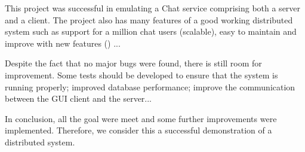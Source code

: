 This project was successful in emulating a Chat service comprising both a server and a client.
The project also has many features of a good working distributed system such as support for a million chat users (scalable), easy to maintain and improve with new features () ... 

Despite the fact that no major bugs were found, there is still room for improvement. 
Some tests should be developed to ensure that the system is running properly; improved database performance; improve the communication between the GUI client and the server...

In conclusion, all the goal were meet and some further improvements were implemented. Therefore, we consider this a successful demonstration of a distributed system.